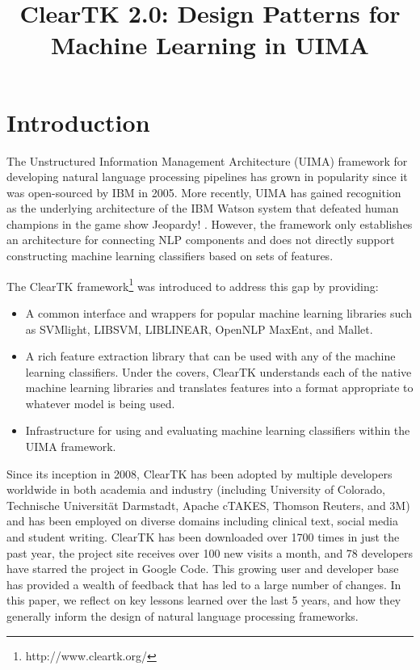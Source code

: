 \documentclass[10pt, a4paper]{article}
\title{ClearTK 2.0: Design Patterns for Machine Learning in UIMA}
\begin{document}
\maketitleabstract

\section{Introduction}
The Unstructured Information Management Architecture (UIMA) framework for developing natural language processing pipelines has grown in popularity since it was open-sourced by IBM in 2005.  More recently, UIMA has gained recognition as the underlying architecture of the IBM Watson system that defeated human champions in the game show Jeopardy! \cite{ferrucci_building_2010}.
However, the framework only establishes an architecture for connecting NLP components and does not directly support constructing machine learning classifiers based on sets of features.

The ClearTK framework\footnote{http://www.cleartk.org/} was introduced to address this gap \cite{ogren-etal:2008:UIMA-LREC,ogren-etal:2009:UIMA-GSCL} by providing:
\begin{itemize}
\item A common interface and wrappers for popular machine learning libraries such as SVMlight, LIBSVM, LIBLINEAR, OpenNLP MaxEnt, and Mallet.
\item A rich feature extraction library that can be used with any of the machine learning classifiers. Under the covers, ClearTK understands each of the native machine learning libraries and translates features into a format appropriate to whatever model is being used.
\item Infrastructure for using and evaluating machine learning classifiers within the UIMA framework.
\end{itemize}

Since its inception in 2008, ClearTK has been adopted by multiple developers worldwide in both academia and industry (including University of Colorado, Technische Universit\"{a}t Darmstadt, Apache cTAKES, Thomson Reuters, and 3M) and has been employed on diverse domains including clinical text, social media and student writing.
ClearTK has been downloaded over 1700 times in just the past year, the project site receives over 100 new visits a month, and 78 developers have starred the project in Google Code.  
This growing user and developer base has provided a wealth of feedback that has led to a large number of changes.
In this paper, we reflect on key lessons learned over the last 5 years, and how they generally inform the design of natural language processing frameworks.
\end{document}
